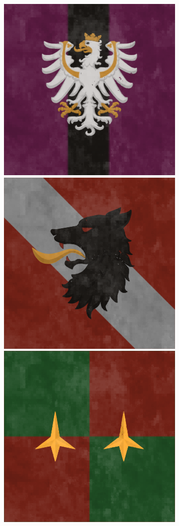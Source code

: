 \begin{figure}[!ht]
    \centering      
        \includegraphics[scale=0.25]{img/flag/atheryn.png}
        \includegraphics[scale=0.25]{img/flag/eskand.png}
        \includegraphics[scale=0.25]{img/flag/fnc.png}

\end{figure}
